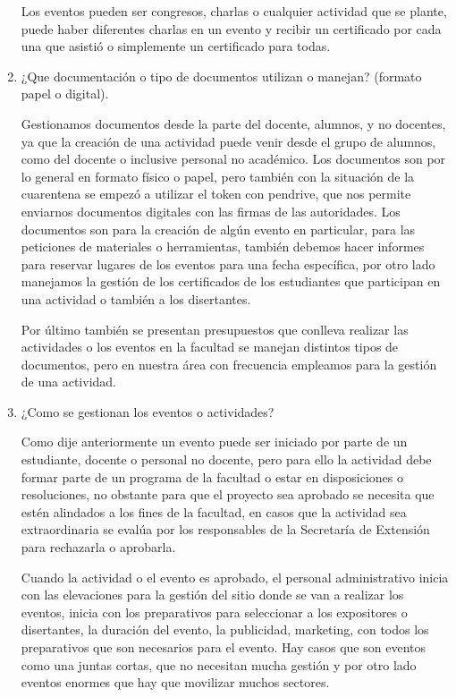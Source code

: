 \begin{enumerate}
    Los eventos pueden ser congresos, charlas o cualquier actividad que se plante,
    puede haber diferentes charlas en un evento y recibir un certificado por 
    cada una que asistió o simplemente un certificado para todas.



     
    \item ¿Que documentación o tipo de documentos utilizan o manejan? (formato papel o digital).
   
   
    Gestionamos documentos desde la parte del docente, alumnos, y no docentes, ya que la creación de una actividad puede venir desde el grupo de alumnos, como del docente o inclusive personal 
    no académico. Los documentos son por lo general en formato físico o papel, pero también con la situación de la cuarentena se empezó a utilizar el token con pendrive,
    que nos permite enviarnos documentos digitales con las firmas de las autoridades. Los documentos son para la creación de algún evento en particular, para las peticiones de materiales o herramientas, 
    también debemos hacer informes para reservar lugares de los eventos para una fecha específica, por otro lado manejamos la gestión de los certificados de los estudiantes
    que participan en una actividad o también a los disertantes. 
    
    Por último también se presentan presupuestos que conlleva realizar las actividades o los eventos en la facultad se manejan distintos tipos de documentos, pero en nuestra área con frecuencia
    empleamos para la gestión de una actividad.


    
    \item ¿Como se gestionan los eventos o actividades?
    
    Como dije anteriormente un evento puede ser iniciado por parte de un estudiante, docente o personal no docente, pero para ello
    la actividad debe formar parte de un programa de la facultad o estar en disposiciones o resoluciones, 
    no obstante para que el proyecto sea aprobado se necesita que estén alindados a los fines de la facultad, en casos
    que la actividad sea extraordinaria se evalúa por los responsables de la Secretaría de Extensión para rechazarla o aprobarla.

    Cuando la actividad o el evento es aprobado, el personal administrativo inicia con las elevaciones para 
    la gestión del sitio donde se van a realizar los eventos, inicia con los preparativos para seleccionar a los 
    expositores o disertantes, la duración del evento, la publicidad, marketing, con todos los preparativos que son necesarios para el evento.
    Hay casos que son eventos como una juntas cortas, que no necesitan mucha gestión y por otro lado eventos enormes que hay que movilizar muchos sectores.
    



\end{enumerate}

